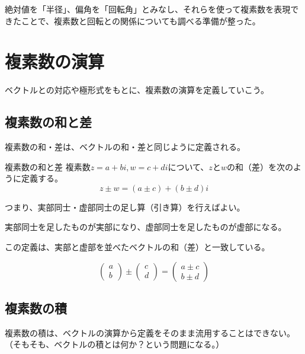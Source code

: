 \documentclass[../imaging-math]{subfiles}
\begin{document}
絶対値を「半径」、偏角を「回転角」とみなし、それらを使って複素数を表現できたことで、複素数と回転との関係についても調べる準備が整った。

\section{複素数の演算}

ベクトルとの対応や極形式をもとに、複素数の演算を定義していこう。

\subsection{複素数の和と差}

複素数の和・差は、ベクトルの和・差と同じように定義される。

\begin{definition}{複素数の和と差}
  \titlegap
  複素数$z=a+bi, w = c +di$について、$z$と$w$の和（差）を次のように定義する。
  \LARGE
  \begin{equation}
    z \pm w = (a \pm c) + (b \pm d)i
  \end{equation}
\end{definition}

つまり、実部同士・虚部同士の足し算（引き算）を行えばよい。

実部同士を足したものが実部になり、虚部同士を足したものが虚部になる。

この定義は、実部と虚部を並べたベクトルの和（差）と一致している。

\begin{equation}
  \begin{pmatrix}
    a \\
    b
  \end{pmatrix} \pm \begin{pmatrix}
    c \\
    d
  \end{pmatrix} = \begin{pmatrix}
    a \pm c \\
    b \pm d
  \end{pmatrix}
\end{equation}

\subsection{複素数の積}

複素数の積は、ベクトルの演算から定義をそのまま流用することはできない。
（そもそも、ベクトルの積とは何か？という問題になる。）
\end{document}
